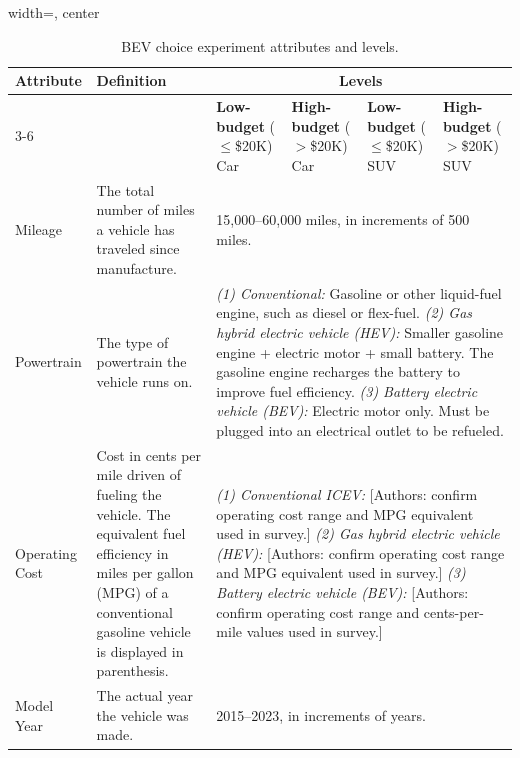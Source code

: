 \documentclass[a4paper,fleqn]{cas-sc}   %
\begin{document}
\begin{table}[pos=H]
\caption{BEV choice experiment attributes and levels.}
\label{table:dce_attributes}
\begin{adjustbox}{width=\textwidth, center}
{\renewcommand{\arraystretch}{1.4}
\begin{tabular}{p{3.2cm} p{4.8cm} p{3cm} p{3cm} p{3cm} p{3cm}}
\toprule
\multirow{2}{*}{\textbf{Attribute}} & \multirow{2}{*}{\textbf{Definition}} & \multicolumn{4}{c}{\textbf{Levels}} \\
\cmidrule(lr){3-6}
 & & \textbf{Low-budget} \newline ($\leq$\$20K) Car & \textbf{High-budget} \newline ($>$\$20K) Car & \textbf{Low-budget} \newline ($\leq$\$20K) SUV & \textbf{High-budget} \newline ($>$\$20K) SUV \\
\midrule
Mileage & The total number of miles a vehicle has traveled since manufacture. & \multicolumn{4}{p{12.5cm}}{15,000--60,000 miles, in increments of 500 miles.} \\
\addlinespace[4pt]
Powertrain & The type of powertrain the vehicle runs on. & \multicolumn{4}{p{12.5cm}}{%
  \textit{(1) Conventional:} Gasoline or other liquid-fuel engine, such as diesel or flex-fuel.\newline
  \textit{(2) Gas hybrid electric vehicle (HEV):} Smaller gasoline engine + electric motor + small battery. The gasoline engine recharges the battery to improve fuel efficiency.\newline
  \textit{(3) Battery electric vehicle (BEV):} Electric motor only. Must be plugged into an electrical outlet to be refueled.} \\
\addlinespace[4pt]
Operating Cost & Cost in cents per mile driven of fueling the vehicle. The equivalent fuel efficiency in miles per gallon (MPG) of a conventional gasoline vehicle is displayed in parenthesis. & \multicolumn{4}{p{12.5cm}}{%
  \textit{(1) Conventional ICEV:} [Authors: confirm operating cost range and MPG equivalent used in survey.]\newline
  \textit{(2) Gas hybrid electric vehicle (HEV):} [Authors: confirm operating cost range and MPG equivalent used in survey.]\newline
  \textit{(3) Battery electric vehicle (BEV):} [Authors: confirm operating cost range and cents-per-mile values used in survey.]} \\
\addlinespace[4pt]
Model Year & The actual year the vehicle was made. & \multicolumn{4}{p{12.5cm}}{2015--2023, in increments of years.} \\

\end{tabular}}
\end{adjustbox}
\end{table}
\end{document}
